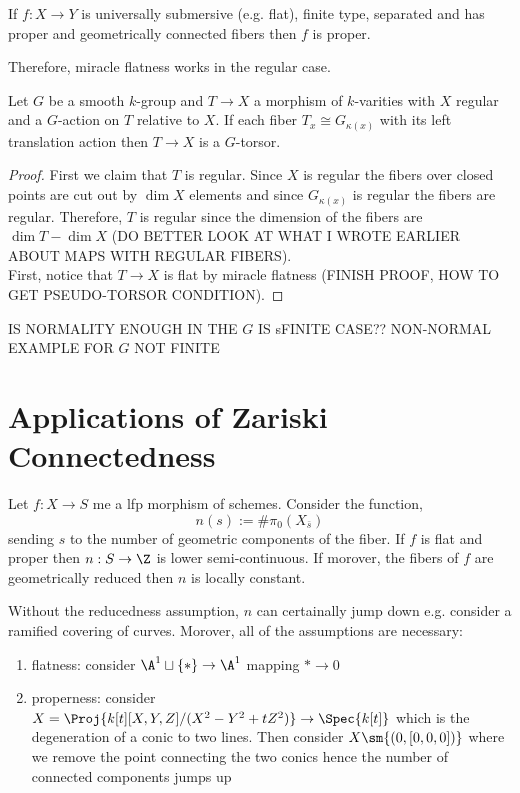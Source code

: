 \documentclass[12pt]{article}
\begin{document}
\begin{prop}[EGA IV.15.7.10]
If $f : X \to Y$ is universally submersive (e.g. flat), finite type, separated and has proper and geometrically connected fibers then $f$ is proper.
\end{prop}


Therefore, miracle flatness works in the regular case. 

\begin{prop}
Let $G$ be a smooth $k$-group and $T \to X$ a morphism of $k$-varities with $X$ regular and a $G$-action on $T$ relative to $X$. If each fiber $T_x \cong G_{\kappa(x)}$ with its left translation action then $T \to X$ is a $G$-torsor. 
\end{prop}

\begin{proof}
First we claim that $T$ is regular. Since $X$ is regular the fibers over closed points are cut out by $\dim{X}$ elements and since $G_{\kappa(x)}$ is regular the fibers are regular. Therefore, $T$ is regular since the dimension of the fibers are $\dim{T} - \dim{X}$ (DO BETTER LOOK AT WHAT I WROTE EARLIER ABOUT MAPS WITH REGULAR FIBERS).
\bigskip\\
First, notice that $T \to X$ is flat by miracle flatness (FINISH PROOF, HOW TO GET PSEUDO-TORSOR CONDITION).
\end{proof}


IS NORMALITY ENOUGH IN THE $G$ IS sFINITE CASE?? NON-NORMAL EXAMPLE FOR $G$ NOT FINITE

\section{Applications of Zariski Connectedness}

\begin{prop}
Let $f : X \to S$ me a lfp morphism of schemes. Consider the function,
\[ n(s) := \# \pi_0(X_{\bar{s}}) \]
sending $s$ to the number of geometric components of the fiber. If $f$ is flat and proper then $n : S \to \Z$ is lower semi-continuous. If morover, the fibers of $f$ are geometrically reduced then $n$ is locally constant.
\end{prop}

\begin{rmk}
Without the reducedness assumption, $n$ can certainally jump down e.g. consider a ramified covering of curves. Morover, all of the assumptions are necessary:
\begin{enumerate}
\item flatness: consider $\A^1 \sqcup \{ * \} \to \A^1$ mapping $* \to 0$
\item properness: consider $X = \Proj{k[t][X,Y,Z]/(X^2  - Y^2 + t Z^2)} \to \Spec{k[t]}$ which is the degeneration of a conic to two lines. Then consider $X \sm \{ (0, [0,0,0]) \}$ where we remove the point connecting the two conics hence the number of connected components jumps up
\end{enumerate}
\end{rmk}
\end{document}
